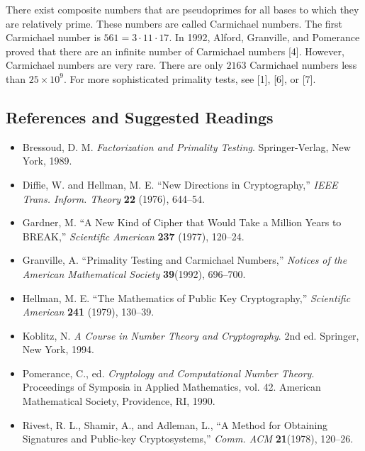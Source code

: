 {\begin{enumerate}
 
There exist composite numbers that are pseudoprimes for all bases to
which they are relatively prime.  These numbers are called {\bfi
Carmichael numbers}. The first Carmichael
number is $561 = 3 \cdot 11 \cdot 17$.  In 1992, Alford, Granville, and
Pomerance proved that there are an infinite number of Carmichael
numbers [4].  However, Carmichael numbers are very rare.  There are
only $2163$ Carmichael numbers less than $25 \times 10^9$. For more
sophisticated primality tests, see [1], [6], or [7].  
 
 
\end{enumerate}
}
 
 
\subsection*{References and Suggested Readings}
 
{\small
\begin{itemize}
 
\item[{\bf [1]}]
Bressoud, D. M. {\it Factorization and Primality Testing}.
Springer-Verlag, New York, 1989. 
 
\item[{\bf [2]}]
Diffie, W. and Hellman, M. E. ``New Directions in
Cryptography,'' {\it IEEE Trans. Inform. Theory} {\bf
22} (1976), 644--54.
 
\item[{\bf [3]}]
Gardner, M. ``A New Kind of Cipher that Would Take a Million
Years to BREAK,'' {\it Scientific American} {\bf
237} (1977), 120--24.
 
\item[{\bf [4]}]%
Granville, A. ``Primality Testing and Carmichael Numbers,'' {\it
Notices of the American Mathematical Society} {\bf 39}(1992),
696--700. 
 
\item[{\bf [5]}]
Hellman, M. E. ``The Mathematics of Public Key
Cryptography,''  {\it Scientific American} {\bf 241}
(1979), 130--39.
 

\item[{\bf [6]}] %
Koblitz, N. {\it A Course in Number Theory and Cryptography}. 2nd ed.
Springer, New York, 1994.  
 
 
\item[{\bf [7]}]
Pomerance, C., ed. {\it Cryptology and Computational Number
Theory}. Proceedings of Symposia in Applied Mathematics,
vol. 42. American Mathematical Society, Providence, RI,
1990.
 
\item[{\bf [8]}]
Rivest, R. L., Shamir, A., and Adleman, L., ``A Method for
Obtaining Signatures and Public-key Cryptosystems,'' {\it
Comm. ACM} {\bf 21}(1978), 120--26.
 
\end{itemize}
}
 
 
 
